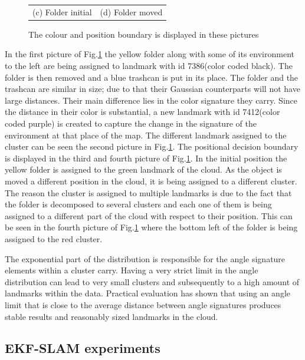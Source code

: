 \documentclass[twoside,hidelinks]{article}
\begin{document}
\begin{figure}
\begin{tabular}{cc}
(c) Folder initial  & (d) Folder moved \\[6pt]
\end{tabular}
\caption{The colour and position boundary is displayed in these pictures}
  \label{pip:bounds}
\end{figure}

In the first picture of Fig.\ref{pip:bounds} the yellow folder along with some of its environment to the left are being assigned to landmark with id 7386(color coded black). The folder is then removed and a blue trashcan is put in its place. The folder and the trashcan are similar in size; due to that their Gaussian counterparts will not have large distances. Their main difference lies in the color signature they carry. Since the distance in their color is substantial, a new landmark with id 7412(color coded purple) is created to capture the change in the signature of the environment at that place of the map. The different landmark assigned to the cluster can be seen the second picture in Fig.\ref{pip:bounds}. The positional decision boundary is displayed in the third and fourth picture of Fig.\ref{pip:bounds}. In the initial position the yellow folder is assigned to the green landmark of the cloud. As the object is moved a different position in the cloud, it is being assigned to a different cluster. The reason the cluster is assigned to multiple landmarks is due to the fact that the folder is decomposed to several clusters and each one of them is being assigned to a different part of the cloud with respect to their position. This can be seen in the fourth picture of Fig.\ref{pip:bounds} where the bottom left of the folder is being assigned to the red cluster.

The exponential part of the distribution is responsible for the angle signature elements within a cluster carry. Having a very strict limit in the angle distribution can lead to very small clusters and subsequently to a high amount of landmarks within the data. Practical evaluation has shown that using an angle limit that is close to the average distance between angle signatures produces stable results and reasonably sized landmarks in the cloud.

\subsection{EKF-SLAM experiments}
\end{document}
